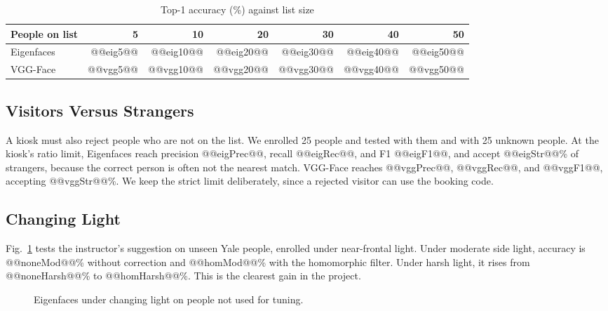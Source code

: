 \documentclass[conference,a4paper]{IEEEtran}
\begin{document}
\begin{table}[t]
\caption{Top-1 accuracy (\%) against list size}
\label{tab:list}
\centering\footnotesize
\begin{tabular}{@{}lrrrrrr@{}}
\toprule
People on list & 5 & 10 & 20 & 30 & 40 & 50 \\
\midrule
Eigenfaces & @@eig5@@ & @@eig10@@ & @@eig20@@ & @@eig30@@ & @@eig40@@ & @@eig50@@ \\
VGG-Face & @@vgg5@@ & @@vgg10@@ & @@vgg20@@ & @@vgg30@@ & @@vgg40@@ & @@vgg50@@ \\
\bottomrule
\end{tabular}
\end{table}

\subsection{Visitors Versus Strangers}
A kiosk must also reject people who are not on the list. We enrolled 25 people and tested with them and with 25 unknown people. At the kiosk's ratio limit, Eigenfaces reach precision @@eigPrec@@, recall @@eigRec@@, and F1 @@eigF1@@, and accept @@eigStr@@\% of strangers, because the correct person is often not the nearest match. VGG-Face reaches @@vggPrec@@, @@vggRec@@, and @@vggF1@@, accepting @@vggStr@@\%. We keep the strict limit deliberately, since a rejected visitor can use the booking code.

\subsection{Changing Light}
Fig.~\ref{fig:light} tests the instructor's suggestion on unseen Yale people, enrolled under near-frontal light. Under moderate side light, accuracy is @@noneMod@@\% without correction and @@homMod@@\% with the homomorphic filter. Under harsh light, it rises from @@noneHarsh@@\% to @@homHarsh@@\%. This is the clearest gain in the project.

\begin{figure}[t]
\centering
{}
\caption{Eigenfaces under changing light on people not used for tuning.}
\label{fig:light}
\end{figure}
\end{document}
